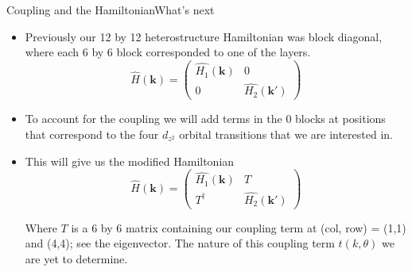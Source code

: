 \documentclass[9pt]{beamer}
\begin{document}
\begin{frame}{Coupling and the Hamiltonian}{What's next}
  \begin{itemize}
    \item{Previously our 12 by 12 heterostructure Hamiltonian was block diagonal, where each 6 by 6 block corresponded to one of the layers.
      \begin{equation}
        \hat{H}(\boldsymbol{k})=\left(\begin{array}{cc}
          \hat{H_1}(\boldsymbol{k}) & 0\\
          0 & \hat{H_2}(\boldsymbol{k'})
        \end{array}\right)
      \end{equation}
      }

    \item To account for the coupling we will add terms in the 0 blocks at positions that correspond to the four $d_{z^2}$ orbital transitions that we are interested in.

    \item{This will give us the modified Hamiltonian
      \begin{equation}
        \hat{H}(\boldsymbol{k})=\left(\begin{array}{cc}
          \hat{H_1}(\boldsymbol{k}) & T\\
          T^{\dagger} & \hat{H_2}(\boldsymbol{k'})
        \end{array}\right)
      \end{equation}

      Where $T$ is a 6 by 6 matrix containing our coupling term at (col, row) = (1,1) and (4,4); see the eigenvector. The nature of this coupling term $t(k, \theta)$ we are yet to determine.
      }
  \end{itemize}
\end{frame}
\end{document}
